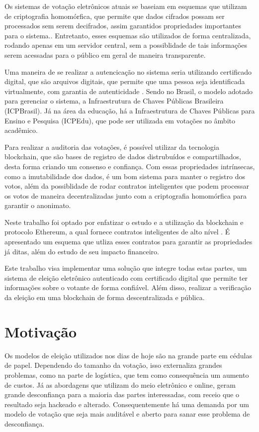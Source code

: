 \documentclass{ufsctex/ufsctex}
\begin{document}
Os sistemas de votação eletrônicos atuais se baseiam em esquemas que utilizam de criptografia
homomórfica, que permite que dados cifrados possam ser processados sem serem decifrados, assim
garantidos propriedades importantes para o sistema.\cite{springer}. Entretanto, esses esquemas
são utilizados de forma centralizada, rodando apenas em um servidor central, sem a possiblidade
de tais informações serem acessadas para o público em geral de maneira transparente.

Uma maneira de se realizar a autencicação no sistema seria utilizando certificado
digital, que são arquivos digitais, que permite que uma pessoa seja identificada
virtualmente, com garantia de autenticidade \cite{pki}. Sendo no Brasil, o modelo adotado para
gerenciar o sistema, a Infraestrutura de Chaves Públicas Brasileira (ICPBrasil). Já na área
da educação, há a Infraestrutura de Chaves Públicas para Ensino e Pesquisa (ICPEdu), que
pode ser utilizada em votações no âmbito acadêmico.

Para realizar a auditoria das votações, é possível utilizar da tecnologia
blockchain, que são bases de registro de dados distrubuídos e compartilhados,
desta forma criando um consenso e confiança. \cite{nakamoto2012bitcoin} Com essas
propriedades intrínsecas, como a imutabilidade dos dados, é um bom sistema para 
manter o registro dos votos, além da possiblidade de rodar contratos inteligentes que
podem processar os votos de maneira decentralizadas junto com a criptografia homomórfica
para garantir o anonimato.

Neste trabalho foi optado por enfatizar o estudo e a utilização da blockchain e protocolo
Ethereum, a qual fornece contratos inteligentes de alto nível \cite{ethereum}.
É apresentado um esquema que utliza esses contratos para garantir as propriedades já ditas,
além do estudo de seu impacto financeiro.

Este trabalho visa implementar uma solução que integre todas estas partes, um sistema
de eleição eletrônico autenticado com certificado digital que permite ter informações
sobre o votante de forma confiável. Além disso, realizar a verificação da eleição em 
uma blockchain de forma descentralizada e pública.

\section{Motivação}

Os modelos de eleição utilizados nos dias de hoje são na grande parte em cédulas
de papel. Dependendo do tamanho da votação, isso externaliza grandes problemas,
como na parte de logística, que tem como consequência um aumento de custos. Já
as abordagens que utilizam do meio eletrônico e online, geram grande desconfiança
para a maioria das partes interessadas, com receio que o resultado seja hackeado
e alterado. Consequentemente há uma demanda por um modelo de votação que seja
mais auditável e aberto para sanar esse problema de desconfiança.
\end{document}
